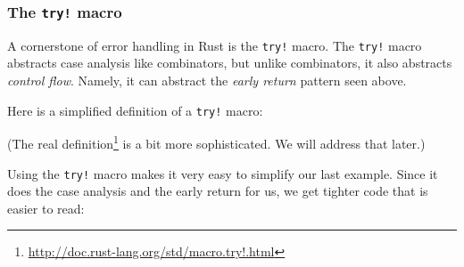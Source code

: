 \documentclass[a4paper,]{book}
\newenvironment{Shaded}{\begin{snugshade}}{\end{snugshade}}
\newcommand{\KeywordTok}[1]{\textcolor[rgb]{0.13,0.29,0.53}{\textbf{{#1}}}}
\newcommand{\ConstantTok}[1]{\textcolor[rgb]{0.00,0.00,0.00}{{#1}}}
\newcommand{\PreprocessorTok}[1]{\textcolor[rgb]{0.56,0.35,0.01}{\textit{{#1}}}}
\newcommand{\NormalTok}[1]{{#1}}
\renewcommand{\href}[2]{#2\footnote{\url{#1}}}
\begin{document}
\hypertarget{the-try-macro}{\subsubsection{\texorpdfstring{The
\texttt{try!} macro}{The try! macro}}\label{the-try-macro}}

A cornerstone of error handling in Rust is the \texttt{try!} macro. The
\texttt{try!} macro abstracts case analysis like combinators, but unlike
combinators, it also abstracts \emph{control flow}. Namely, it can
abstract the \emph{early return} pattern seen above.

Here is a simplified definition of a \texttt{try!} macro:

\protect\hypertarget{code-try-def-simple}{}{}

\begin{Shaded}
\end{Shaded}

(The \href{http://doc.rust-lang.org/std/macro.try!.html}{real
definition} is a bit more sophisticated. We will address that later.)

Using the \texttt{try!} macro makes it very easy to simplify our last
example. Since it does the case analysis and the early return for us, we
get tighter code that is easier to read:
\end{document}
